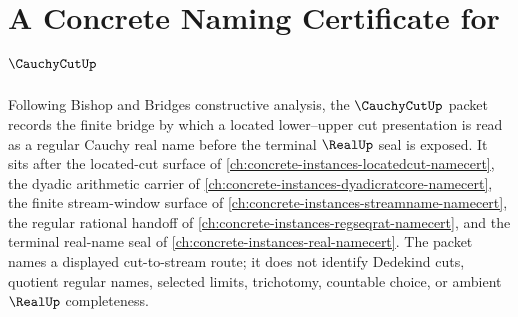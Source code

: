 \chapter{A Concrete Naming Certificate for $\CauchyCutUp$}
\label{ch:concrete-instances-cauchy-cut-namecert}

Following Bishop and Bridges constructive analysis, the $\CauchyCutUp$ packet records the finite bridge by which a located lower--upper cut presentation is read as a regular Cauchy real name before the terminal $\RealUp$ seal is exposed. It sits after the located-cut surface of \autoref{ch:concrete-instances-locatedcut-namecert}, the dyadic arithmetic carrier of \autoref{ch:concrete-instances-dyadicratcore-namecert}, the finite stream-window surface of \autoref{ch:concrete-instances-streamname-namecert}, the regular rational handoff of \autoref{ch:concrete-instances-regseqrat-namecert}, and the terminal real-name seal of \autoref{ch:concrete-instances-real-namecert}. The packet names a displayed cut-to-stream route; it does not identify Dedekind cuts, quotient regular names, selected limits, trichotomy, countable choice, or ambient $\RealUp$ completeness.

